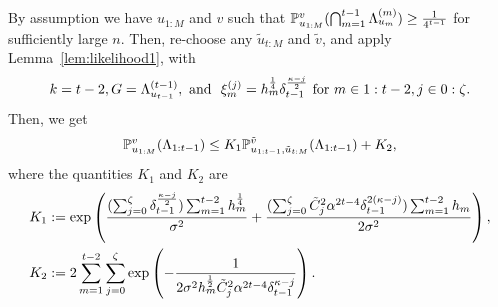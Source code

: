 By assumption we have $u_{1:M}$ and $v$ 
such that $\mathbb{P}_{u_{1:M}}^v (\bigcap_{m=1}^{t-1} \Lambda_{u_{m}}^{({m})} ) \geq \frac{1}{4^{t-1}}$ for sufficiently large $n$.
Then, re-choose any $\tilde u_{t:M}$ and $\tilde v$, and apply Lemma~\ref{lem:likelihood1}, with
\begin{align*}
	k = t-2, 
	G = \Lambda_{u_{t-1}}^{({t-1})}, \text{ and }~
	\xi_m^{(j)} = h_m^{\frac{1}{4}} \delta_{t-1}^{\frac{\kappa-j}{2}} \text{ for } m \in 1:t-2, j \in 0:\zeta.
\end{align*}
Then, we get 
\begin{equation*}
	\mathbb{P}_{u_{1:M}}^v ( \Lambda_{1:{t-1}} )\leq K_1 \mathbb{P}_{u_{1:t-1}, \tilde u_{t:M}}^{\tilde v} ( \Lambda_{1:{t-1}} ) + K_2,
\end{equation*}
where the quantities $K_1$ and $K_2$ are
\begin{align*}
	K_1 &:= \exp \left ( \frac{(\sum_{j=0}^\zeta \delta_{t-1}^{\frac{\kappa-j}{2}}) \sum_{m=1}^{t-2} h_m^{\frac{1}{4}} }{\sigma^2} + 
	\frac {(\sum_{j=0}^\zeta \tilde C_j^2 \alpha^{2t-4} \delta_{t-1}^{2(\kappa-j)}) \sum_{m=1}^{t-2} h_m}{2 \sigma^2}  \right ),\\
	K_2 &:= 2 \sum_{m=1}^{t-2} \sum_{j=0}^{\zeta}
	\exp \left (  -\frac {1}{2 \sigma^2  h_{m}^{\frac{1}{2}} \tilde C_j^2 \alpha^{2t-4} \delta_{t-1}^{\kappa-j}}  \right ).
\end{align*}


